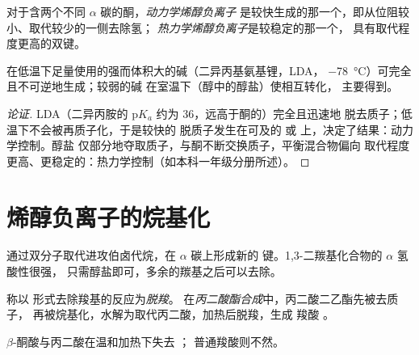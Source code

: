 \begin{definition}[动力学与热力学烯醇负离子]\label{def:b2:enolates-aldol:kinetic-enolate}
对于含两个不同 $\alpha$ 碳的酮，\emph{动力学烯醇负离子}
是较快生成的那一个，即从位阻较小、取代较少的一侧去除氢；
\emph{热力学烯醇负离子}是较稳定的那一个，
具有取代程度更高的双键。
\end{definition}

\begin{proposition}[烯醇负离子的选择]\label{prop:b2:enolates-aldol:enolate-control}
在低温下足量使用的强而体积大的碱（二异丙基氨基锂，LDA，
\qty{-78}{\degreeCelsius}）可完全且不可逆地生成；较弱的碱
在室温下（醇中的醇盐）使相互转化，
主要得到。
\end{proposition}

\begin{proof}[论证]
LDA（二异丙胺的 $\mathrm pK_a$ 约为 36，远高于酮的）完全且迅速地
脱去质子；低温下不会被再质子化，于是较快的
脱质子发生在可及的  或  上，决定了结果：动力学控制。醇盐
仅部分地夺取质子，与酮不断交换质子，平衡混合物偏向
取代程度更高、更稳定的：热力学控制（如本科一年级分册所述）。
\end{proof}

\section{烯醇负离子的烷基化}

通过双分子取代进攻伯卤代烷，在
$\alpha$ 碳上形成新的  键。1,3-二羰基化合物的 $\alpha$ 氢酸性很强，
只需醇盐即可，多余的羰基之后可以去除。

\begin{definition}[脱羧]\label{def:b2:enolates-aldol:decarboxylation}
称以  形式去除羧基的反应为\emph{脱羧}。
在\emph{丙二酸酯合成}中，丙二酸二乙酯先被去质子，
再被烷基化，水解为取代丙二酸，加热后脱羧，生成
羧酸 。
\end{definition}

\begin{proposition}[易脱羧的情形]\label{prop:b2:enolates-aldol:decarboxylation}
$\beta$-酮酸与丙二酸在温和加热下失去 ；
普通羧酸则不然。
\end{proposition}

